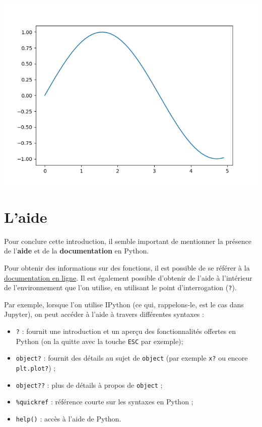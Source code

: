 \documentclass[
  12pt,
]{book}
\providecommand{\tightlist}{%
  \setlength{\itemsep}{0pt}\setlength{\parskip}{0pt}}
\numberwithin{equation}{section}
\numberwithin{countremarque}{section}
\begin{document}
\begin{center}\includegraphics[width=9.03in]{figs/intro_pyplot} \end{center}

\section{L'aide}\label{laide}

Pour conclure cette introduction, il semble important de mentionner la présence de l'\textbf{aide} et de la \textbf{documentation} en Python.

Pour obtenir des informations sur des fonctions, il est possible de se référer à la \href{https://docs.python.org/3/}{documentation en ligne}. Il est également possible d'obtenir de l'aide à l'intérieur de l'environnement que l'on utilise, en utilisant le point d'interrogation (\texttt{?}).

Par exemple, lorsque l'on utilise IPython (ce qui, rappelons-le, est le cas dans Jupyter), on peut accéder à l'aide à travers différentes syntaxes :

\begin{itemize}
\tightlist
\item
  \texttt{?} : fournit une introduction et un aperçu des fonctionnalités offertes en Python (on la quitte avec la touche \texttt{ESC} par exemple);
\item
  \texttt{object?} : fournit des détails au sujet de \texttt{\textquotesingle{}object\textquotesingle{}} (par exemple \texttt{x?} ou encore \texttt{plt.plot?}) ;
\item
  \texttt{object??} : plus de détails à propos de \texttt{\textquotesingle{}object\textquotesingle{}} ;
\item
  \texttt{\%quickref} : référence courte sur les syntaxes en Python ;
\item
  \texttt{help()} : accès à l'aide de Python.
\end{itemize}
\end{document}
